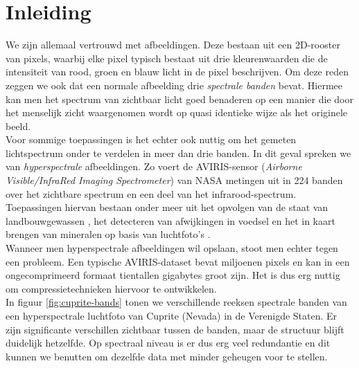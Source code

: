 \chapter{Inleiding}
\label{hoofdstuk:inleiding}

We zijn allemaal vertrouwd met afbeeldingen. Deze bestaan uit een 2D-rooster van pixels, waarbij elke pixel typisch bestaat uit drie kleurenwaarden die de intensiteit van rood, groen en blauw licht in de pixel beschrijven. Om deze reden zeggen we ook dat een normale afbeelding drie \textit{spectrale banden} bevat. Hiermee kan men het spectrum van zichtbaar licht goed benaderen op een manier die door het menselijk zicht waargenomen wordt op quasi identieke wijze als het originele beeld.\\

Voor sommige toepassingen is het echter ook nuttig om het gemeten lichtspectrum onder te verdelen in meer dan drie banden. In dit geval spreken we van \textit{hyperspectrale} afbeeldingen. Zo voert de AVIRIS-sensor (\textit{Airborne Visible/InfraRed Imaging Spectrometer}) van NASA \cite{ref:aviris_website} metingen uit in 224 banden over het zichtbare spectrum en een deel van het infrarood-spectrum. Toepassingen hiervan bestaan onder meer uit het opvolgen van de staat van landbouwgewassen \cite{ref:tilling}, het detecteren van afwijkingen in voedsel \cite{ref:higgins} en het in kaart brengen van mineralen op basis van luchtfoto's \cite{ref:resmini}.\\

Wanneer men hyperspectrale afbeeldingen wil opslaan, stoot men echter tegen een probleem. Een typische AVIRIS-dataset bevat miljoenen pixels en kan in een ongecomprimeerd formaat tientallen gigabytes groot zijn. Het is dus erg nuttig om compressietechnieken hiervoor te ontwikkelen.\\

In figuur \ref{fig:cuprite-bands} tonen we verschillende reeksen spectrale banden van een hyperspectrale luchtfoto van Cuprite (Nevada) in de Verenigde Staten. Er zijn significante verschillen zichtbaar tussen de banden, maar de structuur blijft duidelijk hetzelfde. Op spectraal niveau is er dus erg veel redundantie en dit kunnen we benutten om dezelfde data met minder geheugen voor te stellen.

